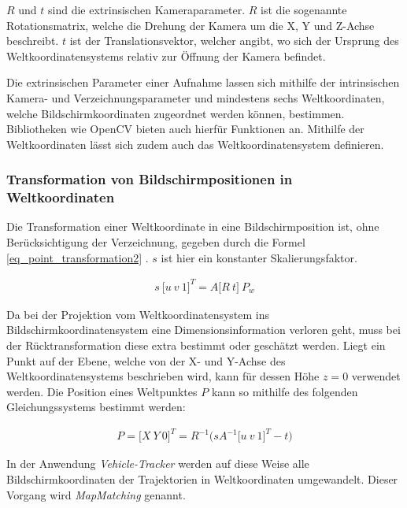 $R$ und $t$ sind die extrinsischen Kameraparameter. $R$ ist die sogenannte Rotationsmatrix, welche
die Drehung der Kamera um die X, Y und Z-Achse beschreibt. $t$ ist der Translationsvektor,
welcher angibt, wo sich der Ursprung des Weltkoordinatensystems relativ zur Öffnung der Kamera befindet. \cite[]{Jahne2012}

Die extrinsischen Parameter einer Aufnahme lassen sich mithilfe der intrinsischen Kamera- und Verzeichnungsparameter
und mindestens sechs Weltkoordinaten, welche Bildschirmkoordinaten zugeordnet werden können, bestimmen. Bibliotheken
wie OpenCV bieten auch hierfür Funktionen an. Mithilfe der Weltkoordinaten lässt sich zudem auch das Weltkoordinatensystem
definieren.

\subsubsection{Transformation von Bildschirmpositionen in Weltkoordinaten}

Die Transformation einer Weltkoordinate in eine Bildschirmposition ist, ohne Berücksichtigung der Verzeichnung,
gegeben durch die Formel \ref{eq_point_transformation2} \cite[]{DevTeamOpenCV2018}. $s$ ist hier ein konstanter
Skalierungsfaktor.

\begin{ceqn}
\begin{align}
\label{eq_point_transformation2}
    s\ \big[u\ v\ 1\big]^T = A \big[R\ t\big]\ P_w
\end{align}
\end{ceqn}

Da bei der Projektion vom Weltkoordinatensystem ins Bildschirmkoordinatensystem eine Dimensionsinformation
verloren geht, muss bei der Rücktransformation diese extra bestimmt oder geschätzt werden. Liegt ein Punkt
auf der Ebene, welche von der X- und Y-Achse des Weltkoordinatensystems beschrieben wird, kann für dessen
Höhe $z = 0$ verwendet werden.
Die Position eines Weltpunktes $P$ kann so mithilfe des folgenden Gleichungssystems bestimmt werden:

\begin{ceqn}
\begin{align}
\label{eq_point_transformation3}
    P = \big[X\ Y\ 0\big]^T = R^{-1}\Big(sA^{-1} \big[u\ v\ 1\big]^T - t\Big)
\end{align}
\end{ceqn}

In der Anwendung \textit{Vehicle-Tracker} werden auf diese Weise alle Bildschirmkoordinaten der Trajektorien
in Weltkoordinaten umgewandelt. Dieser Vorgang wird \textit{MapMatching} genannt.

